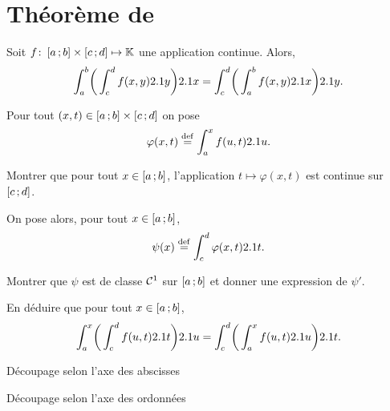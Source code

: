 \section{Théorème de }



\begin{theo}
    Soit $\fonctionligne[f]{\interff{a}{b} \times \interff{c}{d}}{\K}$ une application continue. Alors,
    \[
    \int_{a}^{b} \mathopen{}\bigg( \int_{c}^{d} f(x,y) \d y \bigg) \d x = \int_{c}^{d} \mathopen{}\bigg( \int_{a}^{b} f(x,y) \d x \bigg) \d y.
    \]
\end{theo}

\begin{exercice}
    Pour tout $(x, t) \in \interff{a}{b} \times \interff{c}{d}$ on pose 
    $$\varphi(x, t) \defeq \int_{a}^{x} f(u, t) \d u.$$
    \begin{questions}
    \item Montrer que pour tout $x \in \interff{a}{b}$, l'application $t \mapsto \varphi(x, t)$ est continue sur $\interff{c}{d}$.
    \end{questions}

    On pose alors, pour tout $x  \in \interff{a}{b}$,
    $$\psi(x) \defeq \int_{c}^{d} \varphi(x, t) \d t.$$
    \begin{questions}[resume]
        \item Montrer que $\psi$ est de classe $\Cont^1$ sur $\interff{a}{b}$ et donner une expression de $\psi'$.
        \item En déduire que pour tout $x \in \interff{a}{b}$,
        \[
        \int_{a}^{x} \mathopen{}\bigg( \int_{c}^{d} f(u,t) \d t \bigg) \d u = \int_{c}^{d} \mathopen{}\bigg( \int_{a}^{x} f(u,t) \d u \bigg) \d t.
        \]
    \end{questions}
\end{exercice}


\begin{marginfigure}[-5cm]
    \centering
    
    \caption{Découpage selon l'axe des abscisses}
\end{marginfigure}
\begin{marginfigure}[0cm]
    \centering
    
    \caption{Découpage selon l'axe des ordonnées}
\end{marginfigure}

